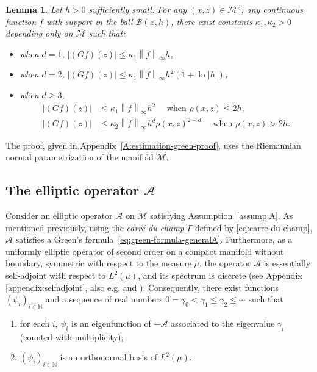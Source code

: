 \documentclass[10pt,a4paper]{article}
\newcommand\cA{\mathcal{A}}
\newcommand\cB{\mathcal{B}}
\newcommand\cM{\mathcal{M}}
\newcommand{\ABS}[1]{{{\left| #1 \right|}}} %
\newcommand{\NRM}[1]{{{\left\| #1\right\|}}} %
\newcommand{\PAR}[1]{{{\left(#1\right)}}} %
\newtheorem{lemma}[theorem]{Lemma}
\begin{document}
\begin{lemma}\label{lem:estimation-green}
	Let $h>0$ sufficiently small. For any $(x,z)\in\cM^2$, any continuous function $f$ with support in the ball $\cB(x,h)$, there exist constants $\kappa_1,\kappa_2>0$ depending only on $\cM$  such that:
 \begin{itemize}
     \item when $d=1$, $\ABS{(Gf)(z)}\le \kappa_1 \NRM{f}_{\infty} h$,
     \item when $d=2$, $\ABS{(Gf)(z)}\le \kappa_1 \NRM{f}_{\infty} h^2(1+\ln |h|)$,
     \item  when $d\ge 3$,
	\begin{align*}
		\ABS{(Gf)(z)}&\le 
		\kappa_1 \NRM{f}_{\infty}h^2\quad \text{ when }\rho(x,z)\le 2h,\\
		\ABS{(Gf)(z)}&\le \kappa_2\NRM{f}_\infty h^d \rho(x,z)^{2-d}\quad \text{ when }\rho(x,z)>2h.
	\end{align*}
 \end{itemize}
\end{lemma}


The proof, given in Appendix~\ref{A:estimation-green-proof}, uses the  Riemannian normal parametrization of the manifold $\cM$.%




\subsection{The  elliptic operator $ \mathcal{A}$ }\label{sec:elliptic}

Consider an elliptic operator $\cA$ on $\cM$ satisfying Assumption~\ref{assump:A}. As mentioned previously, using the \textit{carré du champ} $\Gamma$ defined by \eqref{eq:carre-du-champ}, $\cA$ satisfies a Green's formula~\eqref{eq:green-formula-generalA}. 
    Furthermore, as a uniformly elliptic operator  of second order on a compact manifold without boundary,  symmetric with respect to the measure $\mu$, the operator $\cA$ is  essentially self-adjoint with respect to $L^2(\mu)$, and its spectrum is discrete (see {Appendix \ref{appendix:selfadjoint}, also} e.g. \cite[Chapter 6]{Evans1998} and \cite{toan-thesis}). Consequently, there exist functions $\PAR{\psi_i }_{ i \in \mathbb{N}} $ and a sequence of real numbers $0=\gamma_0 < \gamma_1 \le \gamma_2 \le \cdots $  such that
\begin{enumerate}[label=(\roman*)]
 	\item[(i)] for each $i$, $\psi_i$ is an eigenfunction of $-\cA$ associated to the eigenvalue $\gamma_i$ (counted with multiplicity);
 	\item[(ii)] $\PAR{ \psi_i}_{i\in \mathbb{N}}$ is an orthonormal basis of $L^2(\mu)$.
 \end{enumerate}
\end{document}
